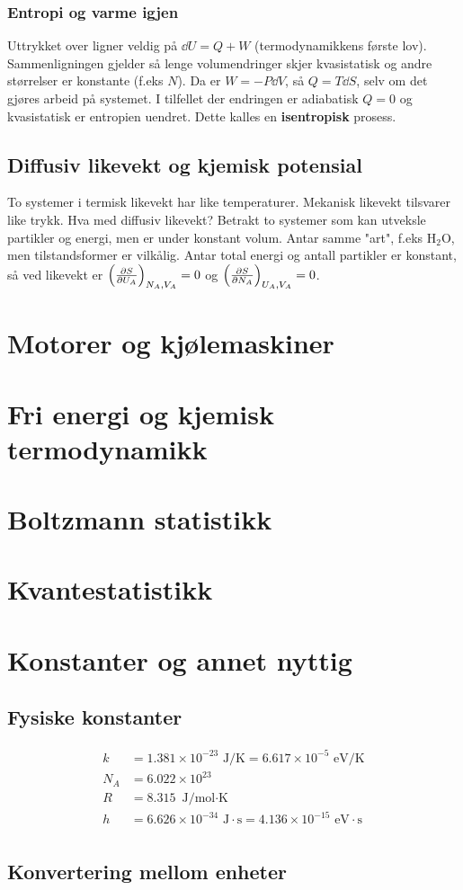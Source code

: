 \documentclass[12pt]{article}
\begin{document}
\subsubsection{Entropi og varme igjen}
Uttrykket over ligner veldig på $\dd U = Q + W$ (termodynamikkens første lov).
Sammenligningen gjelder så lenge volumendringer skjer kvasistatisk og andre
størrelser er konstante (f.eks $N$). Da er $W = -P \dd V$, så $Q = T \dd S$,
selv om det gjøres arbeid på systemet. I tilfellet der endringen er adiabatisk $Q = 0$
og kvasistatisk er entropien uendret. Dette kalles en \textbf{isentropisk} prosess.
\subsection{Diffusiv likevekt og kjemisk potensial}
To systemer i termisk likevekt har like temperaturer. Mekanisk likevekt tilsvarer
like trykk. Hva med diffusiv likevekt? Betrakt to systemer som kan utveksle
partikler og energi, men er under konstant volum. Antar samme "art", f.eks $\text{H}_2\text{O}$,
men tilstandsformer er vilkålig. Antar total energi og antall partikler er konstant,
så ved likevekt er $\left( \pdv{S}{U_A} \right)_{N_A, V_A} = 0$ og $\left( \pdv{S}{N_A} \right)_{U_A, V_A} = 0$.
\section{Motorer og kjølemaskiner}

\section{Fri energi og kjemisk termodynamikk}

\section{Boltzmann statistikk}

\section{Kvantestatistikk}

\section{Konstanter og annet nyttig}
\subsection{Fysiske konstanter}
\begin{align*}
  k   &= 1.381 \times 10^{-23} \text{ J/K} = 6.617 \times 10^{-5} \text{ eV/K} \\
  N_A &= 6.022 \times 10^{23}        \\
  R   &= 8.315 \text{ J/mol$\cdot$K} \\
  h   &= 6.626 \times 10^{-34} \text{ J}\cdot\text{s} = 4.136 \times 10^{-15} \text{ eV}\cdot\text{s}\\
\end{align*}
\subsection{Konvertering mellom enheter}
\end{document}
